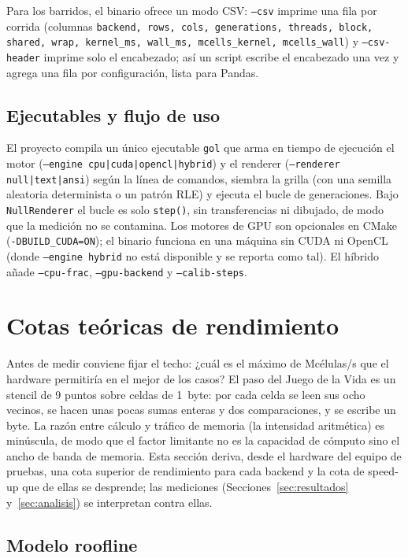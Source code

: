 \documentclass[
	spanish,
	letterpaper, oneside
]{article}
\begin{document}
Para los barridos, el binario ofrece un modo CSV: \texttt{--csv} imprime una fila
por corrida (columnas \texttt{backend, rows, cols, generations, threads, block,
shared, wrap, kernel\_ms, wall\_ms, mcells\_kernel, mcells\_wall}) y
\texttt{--csv-header} imprime solo el encabezado; así un script escribe el
encabezado una vez y agrega una fila por configuración, lista para Pandas.

\subsection{Ejecutables y flujo de uso}
\label{sec:ejecutables}

El proyecto compila un único ejecutable \texttt{gol} que arma en tiempo de
ejecución el motor (\texttt{--engine cpu|cuda|opencl|hybrid}) y el renderer
(\texttt{--renderer null|text|ansi}) según la línea de comandos, siembra la grilla
(con una semilla aleatoria determinista o un patrón RLE) y ejecuta el bucle de
generaciones. Bajo \texttt{NullRenderer} el bucle es solo \texttt{step()}, sin
transferencias ni dibujado, de modo que la medición no se contamina. Los motores
de GPU son opcionales en CMake (\texttt{-DBUILD\_CUDA=ON}); el binario funciona
en una máquina sin CUDA ni OpenCL (donde \texttt{--engine hybrid} no está
disponible y se reporta como tal). El híbrido añade \texttt{--cpu-frac},
\texttt{--gpu-backend} y \texttt{--calib-steps}.

\section{Cotas teóricas de rendimiento}
\label{sec:cotas}

Antes de medir conviene fijar el techo: ¿cuál es el máximo de Mcélulas/s que el
hardware permitiría en el mejor de los casos? El paso del Juego de la Vida es un
stencil de 9 puntos sobre celdas de 1~byte: por cada celda se leen sus ocho
vecinos, se hacen unas pocas sumas enteras y dos comparaciones, y se escribe un
byte. La razón entre cálculo y tráfico de memoria (la intensidad aritmética)
es minúscula, de modo que el factor limitante no es la capacidad de cómputo sino el
ancho de banda de memoria. Esta sección deriva, desde el hardware del equipo
de pruebas, una cota superior de rendimiento para cada backend y la cota de
speed-up que de ellas se desprende; las mediciones
(Secciones~\ref{sec:resultados} y~\ref{sec:analisis}) se interpretan contra ellas.

\subsection{Modelo roofline}
\label{sec:roofline}
\end{document}
